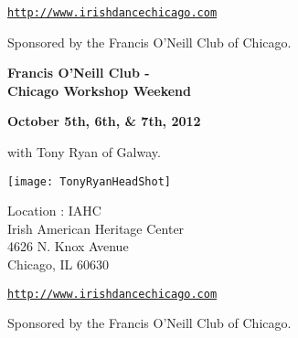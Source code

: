 \documentclass[10pt,letterpaper,notumble]{leaflet}
\begin{document}
\vspace*{2em}
\href{http://www.irishdancechicago.com}{\tt http://www.irishdancechicago.com} 

{\small Sponsored by the Francis O'Neill Club of Chicago.}

\pagebreak
\begin{center}
{\Large\textbf{Francis O'Neill Club - \\ Chicago Workshop Weekend}}\\ 
\end{center}

\begin{center}
\textbf{October 5th, 6th, \&  7th, 2012} 
\end{center}

\vspace*{0.25em}
with Tony Ryan of Galway.

\vspace*{0.45em}
\begin{center}
\texttt{[image: TonyRyanHeadShot]}
\end{center}

\vspace*{2.5em}
Location : IAHC\\
Irish American Heritage Center\\
4626 N. Knox Avenue\\
Chicago, IL  60630 

\vspace*{2em}
\href{http://www.irishdancechicago.com}{\tt http://www.irishdancechicago.com} 

{\small Sponsored by the Francis O'Neill Club of Chicago.}
\end{document}
